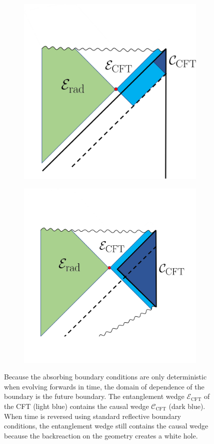 \documentclass[11pt,a4paper]{article}
\begin{document}
\begin{figure} [t]
\vspace{-1.2cm}
\centering
\begin{subfigure}{.48\textwidth}
\vspace{-0.6cm}
  \centering
 \includegraphics[width = 0.8\linewidth]{BH_Penrose_Full.png}
\end{subfigure}
\begin{subfigure}{.48\textwidth}
 \includegraphics[width = 0.9\linewidth]{BH_Penrose_FixedBCs.png}
 \centering
\end{subfigure}
\caption{Because the absorbing boundary conditions are only deterministic when evolving forwards in time, the domain of dependence of the boundary is the future boundary. The entanglement wedge $\mathcal{E}_\text{CFT}$ of the CFT (light blue) contains the causal wedge $\mathcal{C}_\text{CFT}$ (dark blue). When time is reversed using standard reflective boundary conditions, the entanglement wedge still contains the causal wedge because the backreaction on the geometry creates a white hole.}
\label{fig:bh_penrose}
\end{figure}
\end{document}

